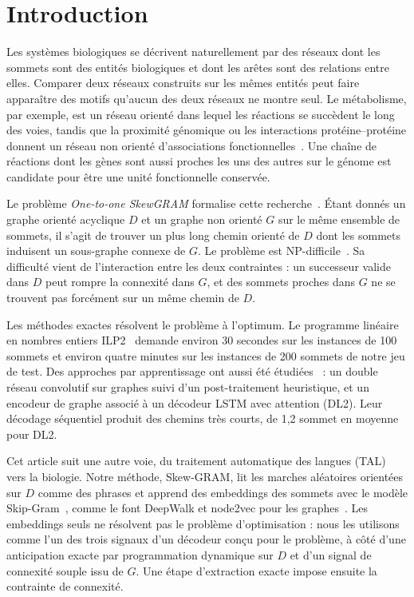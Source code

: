 \documentclass{llncs}
\begin{document}
\section{Introduction}

Les systèmes biologiques se décrivent naturellement par des réseaux dont les sommets sont des entités biologiques et dont les arêtes sont des relations entre elles. Comparer deux réseaux construits sur les mêmes entités peut faire apparaître des motifs qu'aucun des deux réseaux ne montre seul. Le métabolisme, par exemple, est un réseau orienté dans lequel les réactions se succèdent le long des voies, tandis que la proximité génomique ou les interactions protéine--protéine donnent un réseau non orienté d'associations fonctionnelles~\cite{sharan2006,zaharia}. Une chaîne de réactions dont les gènes sont aussi proches les uns des autres sur le génome est candidate pour être une unité fonctionnelle conservée.

Le problème \emph{One-to-one SkewGRAM} formalise cette recherche~\cite{fertin2012,sidi2022}. Étant donnés un graphe orienté acyclique $D$ et un graphe non orienté $G$ sur le même ensemble de sommets, il s'agit de trouver un plus long chemin orienté de $D$ dont les sommets induisent un sous-graphe connexe de $G$. Le problème est NP-difficile~\cite{fertin2012,sidi}. Sa difficulté vient de l'interaction entre les deux contraintes : un successeur valide dans $D$ peut rompre la connexité dans $G$, et des sommets proches dans $G$ ne se trouvent pas forcément sur un même chemin de $D$.

Les méthodes exactes résolvent le problème à l'optimum. Le programme linéaire en nombres entiers ILP2~\cite{sidi2022,sidi} demande environ 30 secondes sur les instances de 100 sommets et environ quatre minutes sur les instances de 200 sommets de notre jeu de test. Des approches par apprentissage ont aussi été étudiées~\cite{sidi_dl} : un double réseau convolutif sur graphes suivi d'un post-traitement heuristique, et un encodeur de graphe associé à un décodeur LSTM avec attention (DL2). Leur décodage séquentiel produit des chemins très courts, de 1,2 sommet en moyenne pour DL2.

Cet article suit une autre voie, du traitement automatique des langues (TAL) vers la biologie. Notre méthode, Skew-GRAM, lit les marches aléatoires orientées sur $D$ comme des phrases et apprend des embeddings des sommets avec le modèle Skip-Gram~\cite{mikolov}, comme le font DeepWalk et node2vec pour les graphes~\cite{perozzi,grover}. Les embeddings seuls ne résolvent pas le problème d'optimisation : nous les utilisons comme l'un des trois signaux d'un décodeur conçu pour le problème, à côté d'une anticipation exacte par programmation dynamique sur $D$ et d'un signal de connexité souple issu de $G$. Une étape d'extraction exacte impose ensuite la contrainte de connexité.
\end{document}
